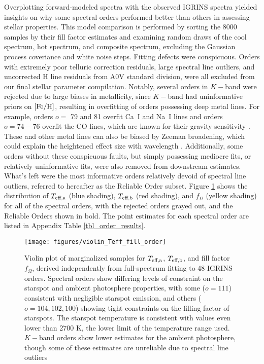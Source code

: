 \documentclass[twocolumn]{emulateapj}%
\begin{document}
Overplotting forward-modeled spectra with the observed IGRINS spectra yielded insights on why some spectral orders performed better than others in assessing stellar properties.  This model comparison is performed by sorting the 8000 samples by their fill factor estimates and examining random draws of the cool spectrum, hot spectrum, and composite spectrum, excluding the Gaussian process coveriance and white noise steps.  Fitting defects were conspicuous.  Orders with extremely poor telluric correction residuals, large spectral line outliers, and uncorrected H line residuals from A0V standard division, were all excluded from our final stellar parameter compilation.  Notably, several orders in $K-$band were rejected due to large biases in metallicity, since $K-$band had uninformative priors on $[{\rm Fe}/{\rm H}]$, resulting in overfitting of orders possessing deep metal lines.  For example, orders $o=$ 79 and 81 overfit Ca~I and Na~I lines and orders $o=74-76$ overfit the CO lines, which are known for their gravity sensitivity .  These and other metal lines can also be biased by Zeeman broadening, which could explain the heightened effect size with wavelength .  Additionally, some orders without these conspicuous faults, but simply possessing mediocre fits, or relatively uninformative fits, were also removed from downstream estimates.  What's left were the most informative orders relatively devoid of spectral line outliers, referred to hereafter as the Reliable Order subset.  Figure \ref{fig:TwoTempResults} shows the distribution of $T_\textrm{eff,a}$ (blue shading), $T_\textrm{eff,b}$ (red shading), and $f_{\Omega}$ (yellow shading) for all of the spectral orders, with the rejected orders grayed out, and the Reliable Orders shown in bold.  The point estimates for each spectral order are listed in Appendix Table \ref{tbl_order_results}.

\begin{figure*}
 \centering
 \texttt{[image: figures/violin\_Teff\_fill\_order]} 
 \caption{Violin plot of marginalized samples for $T_\textrm{eff,a}$, $T_\textrm{eff,b}$, and fill factor $f_{\Omega}$, derived independently from full-spectrum fitting to 48 IGRINS orders.  Spectral orders show differing levels of constraint on the starspot and ambient photosphere properties, with some ($o=111$) consistent with negligible starspot emission, and others ($o=104, 102, 100$) showing tight constraints on the filling factor of starspots.  The starspot temperature is consistent with values even lower than 2700 K, the lower limit of the temperature range used.  $K-$band orders show lower estimates for the ambient photosphere, though some of these estimates are unreliable due to spectral line outliers}
 \label{fig:TwoTempResults}
\end{figure*}
\end{document}
